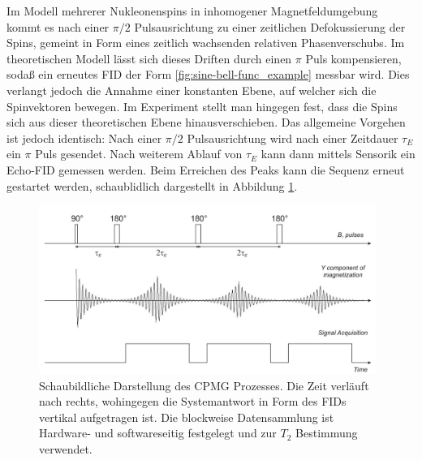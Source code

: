 \documentclass[../../main.tex]{subfiles}
\begin{document}
        Im Modell mehrerer Nukleonenspins in inhomogener Magnetfeldumgebung kommt es nach einer $\pi/2$ Pulsausrichtung zu einer zeitlichen Defokussierung der Spins, gemeint in Form eines zeitlich wachsenden relativen Phasenverschubs. Im theoretischen Modell lässt sich dieses Driften durch einen $\pi$ Puls kompensieren, sodaß ein erneutes FID der Form \ref{fig:sine-bell-func_example} messbar wird. Dies verlangt jedoch die Annahme einer konstanten Ebene, auf welcher sich die Spinvektoren bewegen. Im Experiment stellt man hingegen fest, dass die Spins sich aus dieser theoretischen Ebene hinausverschieben. Das allgemeine Vorgehen ist jedoch identisch: Nach einer $\pi/2$ Pulsausrichtung wird nach einer Zeitdauer $\tau_E$ ein $\pi$ Puls gesendet. Nach weiterem Ablauf von $\tau_E$ kann dann mittels Sensorik ein Echo-FID gemessen werden. Beim Erreichen des Peaks kann die Sequenz erneut gestartet werden, schaublidlich dargestellt in Abbildung \ref{fig:CPMG-Prozess}.
        \begin{figure}[H]
            \centering
            \includegraphics[width=11cm]{Bilddateien/10/CPMG_Prozess.png}
            \caption{Schaubildliche Darstellung des CPMG Prozesses. Die Zeit verläuft nach rechts, wohingegen die Systemantwort in Form des FIDs vertikal aufgetragen ist. Die blockweise Datensammlung ist Hardware- und softwareseitig festgelegt und zur $T_2$ Bestimmung verwendet. \cite[ch 5.3.1]{doc:EFNMRStudentManual}}
            \label{fig:CPMG-Prozess}
        \end{figure}
\end{document}
